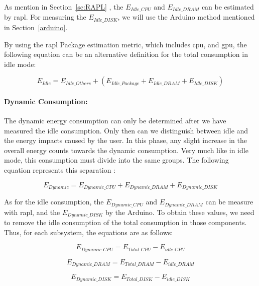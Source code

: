 As mention in Section~\ref{sc:RAPL} , the $E_{Idle\_CPU}$ and $E_{Idle\_DRAM}$ can be estimated by \gls{rapl}. For measuring the $E_{Idle\_DISK}$, we will use the Arduino method mentioned in Section~\ref{arduino}.

By using the \gls{rapl} Package estimation metric, which includes \gls{cpu}, and \gls{gpu}, the following equation can be an alternative definition for the total consumption in idle mode:


\begin{equation}
\label{eq:iddlepackage}
E_{Idle} = E_{Idle\_Others} + ( E_{Idle\_Package} + E_{Idle\_DRAM} + E_{Idle\_DISK})
\end{equation}$
$

\paragraph{Dynamic Consumption:} The dynamic energy consumption can only be determined after we have measured the idle consumption. Only then can we distinguish between idle and the energy impacts caused by the user. In this phase, any slight increase in the overall energy counts towards the dynamic consumption. Very much like in idle mode, this consumption must divide into the same groups. The following equation represents this separation :

\begin{equation}
E_{Dynamic} = E_{Dynamic\_CPU} + E_{Dynamic\_DRAM} + E_{Dynamic\_DISK}
\end{equation}$
$

As for the idle consumption, the  $E_{Dynamic\_CPU}$ and $E_{Dynamic\_DRAM}$  can be measure with \gls{rapl}, and the  $E_{Dynamic\_DISK}$ by the Arduino. To obtain these values, we need to remove the idle consumption of the total consumption in those components. Thus, for each subsystem, the equations are as follows:


\begin{equation}
E_{Dynamic\_CPU} =  E_{Total\_CPU} - E_{idle\_CPU}
\end{equation}$
$

\begin{equation}
E_{Dynamic\_DRAM} =  E_{Total\_DRAM} - E_{idle\_DRAM}
\end{equation}$
$

\begin{equation}
E_{Dynamic\_DISK} =  E_{Total\_DISK} - E_{idle\_DISK}
\end{equation}$
$


